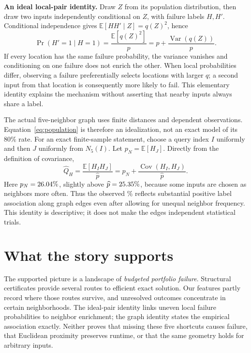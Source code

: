 \documentclass[11pt,english]{article}
\newcommand{\E}{\mathbb E}
\newcommand{\Var}{\operatorname{Var}}
\newcommand{\Cov}{\operatorname{Cov}}
\begin{document}
\textbf{An ideal local-pair identity.} Draw \(Z\) from its population distribution, then draw two inputs independently conditional on \(Z\), with failure labels \(H,H'\). Conditional independence gives \(\E[HH'\mid Z]=q(Z)^2\), hence
\begin{equation}
 \Pr(H'=1\mid H=1)
 =\frac{\E[q(Z)^2]}p
 =\boxed{p+\frac{\Var(q(Z))}{p}}.
 \label{eq:population}
\end{equation}
If every location has the same failure probability, the variance vanishes and conditioning on one failure does not enrich the other. When local probabilities differ, observing a failure preferentially selects locations with larger \(q\); a second input from that location is consequently more likely to fail. This elementary identity explains the mechanism without asserting that nearby inputs always share a label.

The actual five-neighbor graph uses finite distances and dependent observations. Equation~\eqref{eq:population} is therefore an idealization, not an exact model of its 80\% rate. For an exact finite-sample statement, choose a query index \(I\) uniformly and then \(J\) uniformly from \(N_5(I)\). Let \(p_N=\E[H_J]\). Directly from the definition of covariance,
\begin{equation}
 \widehat Q_H
 =\frac{\E[H_IH_J]}{\widehat p}
 =p_N+\frac{\Cov(H_I,H_J)}{\widehat p}.
 \label{eq:graph}
\end{equation}
Here \(p_N=26.04\%\), slightly above \(\widehat p=25.35\%\), because some inputs are chosen as neighbors more often. Thus the observed \ClusterRate\% reflects substantial positive label association along graph edges even after allowing for unequal neighbor frequency. This identity is descriptive; it does not make the edges independent statistical trials.

\section{What the story supports}
The supported picture is a landscape of \emph{budgeted portfolio failure}. Structural certificates provide several routes to efficient exact solution. Our features partly record where those routes survive, and unresolved outcomes concentrate in certain neighborhoods. The ideal-pair identity links uneven local failure probabilities to neighbor enrichment; the graph identity states the empirical association exactly. Neither proves that missing these five shortcuts causes failure, that Euclidean proximity preserves runtime, or that the same geometry holds for arbitrary inputs.
\end{document}
